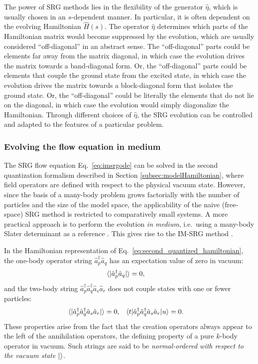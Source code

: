The power of SRG methods lies in the flexibility of the generator $\hat{\eta}$, which is usually chosen in an $s$-dependent manner.  In particular, it is often dependent on the evolving Hamiltonian $\hat{H}(s)$.  The operator $\hat{\eta}$ determines which parts of the Hamiltonian matrix would become suppressed by the evolution, which are usually considered ``off-diagonal'' in an abstract sense.  The ``off-diagonal'' parts could be elements far away from the matrix diagonal, in which case the evolution drives the matrix towards a band-diagonal form.  Or, the ``off-diagonal'' parts could be elements that couple the ground state from the excited state, in which case the evolution drives the matrix towards a block-diagonal form that isolates the ground state.  Or, the ``off-diagonal'' could be literally the elements that do not lie on the diagonal, in which case the evolution would simply diagonalize the Hamiltonian.  Through different choices of $\hat{\eta}$, the SRG evolution can be controlled and adapted to the features of a particular problem.

\subsubsection{Evolving the flow equation in medium}

The SRG flow equation Eq.\ \eqref{eq:imsrgode} can be solved in the second quantization formalism described in Section \ref{subsec:modelHamiltonian}, where field operators are defined with respect to the physical vacuum state.  However, since the basis of a many-body problem grows factorially with the number of particles and the size of the model space, the applicability of the naive (free-space) SRG method is restricted to comparatively small systems.  A more practical approach is to perform the evolution \textit{in medium}, i.e.\ using a many-body Slater determinant as a reference \cite{kehrein2006flow}.  This gives rise to the IM-SRG method \cite{PhysRevC.85.061304,Hergert2016165,lnp936}.

In the Hamiltonian representation of Eq.\ \eqref{eq:second_quantized_hamiltonian}, the one-body operator string $\hat{a}_p^\dagger \hat{a}_q$  has an expectation value of zero in vacuum:
\begin{align}
&\langle  | \hat{a}_p^\dagger \hat{a}_q |  \rangle = 0, \label{eq:vacuum-zero1}
\end{align}
and the two-body string $\hat{a}_p^\dagger \hat{a}_q^\dagger \hat{a}_s \hat{a}_r$ does not couple states with one or fewer particles:
\begin{align}
&\langle  | \hat{a}_p^\dagger \hat{a}_q^\dagger \hat{a}_s \hat{a}_r |  \rangle = 0, &
&\langle t | \hat{a}_p^\dagger \hat{a}_q^\dagger \hat{a}_s \hat{a}_r | u \rangle = 0. \label{eq:vacuum-zero2}
\end{align}
These properties arise from the fact that the creation operators always appear to the left of the annihilation operators, the defining property of a pure $k$-body operator in vacuum.  Such strings are said to be \textit{normal-ordered with respect to the vacuum state $|  \rangle$}.


